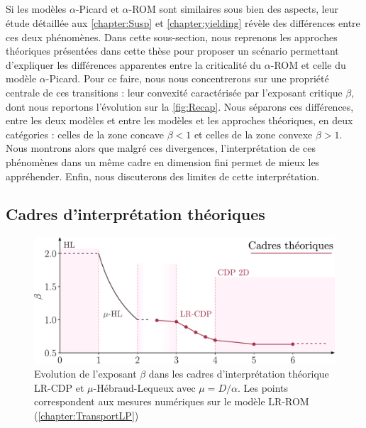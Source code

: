 \subparagraph{}Si les modèles $\alpha$-Picard et $\alpha$-ROM sont similaires sous bien des aspects, leur étude détaillée aux \autoref{chapter:Susp} et \autoref{chapter:yielding} révèle des différences entre ces deux phénomènes. Dans cette sous-section, nous reprenons les approches théoriques présentées dans cette thèse pour proposer un scénario permettant d'expliquer les différences apparentes entre la criticalité du $\alpha$-ROM et celle du modèle $\alpha$-Picard. Pour ce faire, nous nous concentrerons sur une propriété centrale de ces transitions : leur convexité caractérisée par l'exposant critique $\beta$, dont nous reportons l'évolution sur la \autoref{fig:Recap}. Nous séparons ces différences, entre les deux modèles et entre les modèles et les approches théoriques, en deux catégories : celles de la zone concave $\beta < 1$ et celles de la zone convexe $\beta > 1$. Nous montrons alors que malgré ces divergences, l'interprétation de ces phénomènes dans un même cadre en dimension fini permet de mieux les appréhender. Enfin, nous discuterons des limites de cette interprétation.

\label{sec:Diff}

\subsection{Cadres d'interprétation théoriques}

\begin{figure}[h]
	\centering
	\includegraphics[width=\textwidth]{Chapitre5/Figures/RecapTheory.pdf}
	\caption{Evolution de l'exposant $\beta$ dans les cadres d'interprétation théorique LR-CDP et $\mu$-Hébraud-Lequeux avec $\mu = D/\alpha$. Les points correspondent aux mesures numériques sur le modèle LR-ROM (\autoref{chapter:TransportLP})}
	\label{fig:RecapTheory}
\end{figure}

